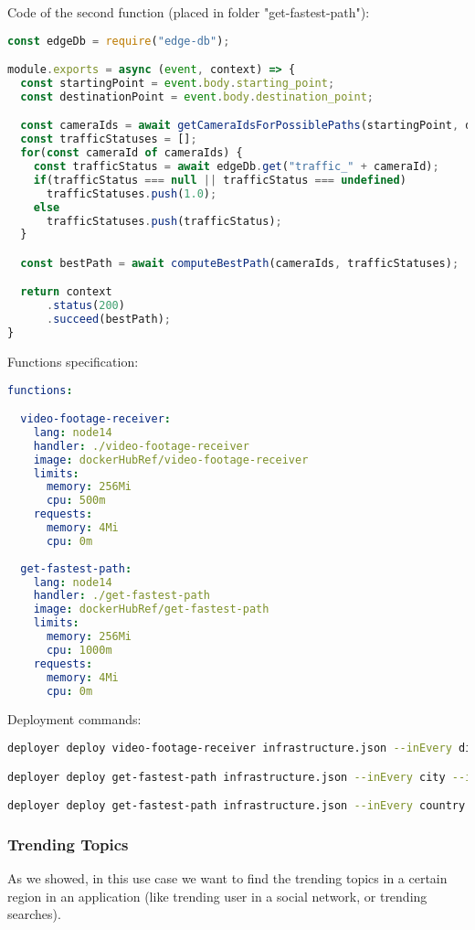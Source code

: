Code of the second function (placed in folder "get-fastest-path"):
\begin{lstlisting}[language=javascript]
const edgeDb = require("edge-db");

module.exports = async (event, context) => {
  const startingPoint = event.body.starting_point;
  const destinationPoint = event.body.destination_point;

  const cameraIds = await getCameraIdsForPossiblePaths(startingPoint, destinationPoint);
  const trafficStatuses = [];
  for(const cameraId of cameraIds) {
    const trafficStatus = await edgeDb.get("traffic_" + cameraId);
    if(trafficStatus === null || trafficStatus === undefined)
      trafficStatuses.push(1.0);
    else
      trafficStatuses.push(trafficStatus);
  }

  const bestPath = await computeBestPath(cameraIds, trafficStatuses);

  return context
      .status(200)
      .succeed(bestPath);
}
\end{lstlisting}

Functions specification:
\begin{lstlisting}[language=yaml,firstnumber=1]
functions:

  video-footage-receiver:
    lang: node14
    handler: ./video-footage-receiver
    image: dockerHubRef/video-footage-receiver
    limits:
      memory: 256Mi
      cpu: 500m
    requests:
      memory: 4Mi
      cpu: 0m
      
  get-fastest-path:
    lang: node14
    handler: ./get-fastest-path
    image: dockerHubRef/get-fastest-path
    limits:
      memory: 256Mi
      cpu: 1000m
    requests:
      memory: 4Mi
      cpu: 0m
\end{lstlisting}

Deployment commands:
\begin{lstlisting}[language=bash]
deployer deploy video-footage-receiver infrastructure.json --inEvery district --inAreas us

deployer deploy get-fastest-path infrastructure.json --inEvery city --inAreas us

deployer deploy get-fastest-path infrastructure.json --inEvery country --inAreas us
\end{lstlisting}


\subsubsection{Trending Topics}
As we showed, in this use case we want to find the trending topics in a certain region in an application (like trending user in a social network, or trending searches).

